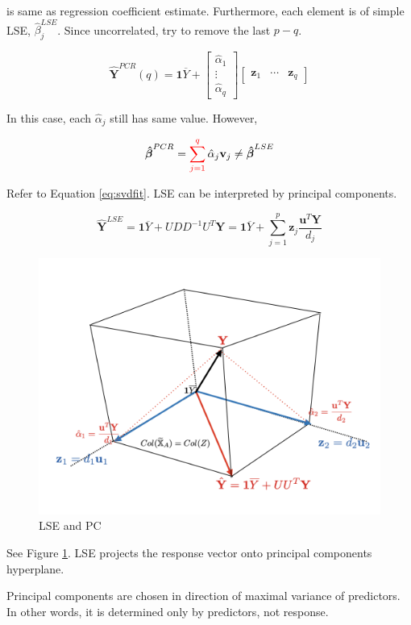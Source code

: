 \documentclass[]{book}
\theoremstyle{definition}
\theoremstyle{definition}
\theoremstyle{definition}
\theoremstyle{remark}
\begin{document}
is same as regression coefficient estimate. Furthermore, each element is of simple LSE, \(\hat\beta_j^{LSE}\). Since uncorrelated, try to remove the last \(p - q\).

\[
\hat{\mathbf{Y}}^{PCR}(q) = \mathbf{1} \overline{Y} + \begin{bmatrix}
  \hat\alpha_1 \\
  \vdots \\
  \hat\alpha_q
\end{bmatrix} \begin{bmatrix}
  \mathbf{z}_1 & \cdots & \mathbf{z}_q
\end{bmatrix}
\]

In this case, each \(\hat\alpha_j\) still has same value. However,

\[\boldsymbol{\hat\beta}^{PCR} = \sum_{j = 1}^{\color{red}{q}} \hat\alpha_j \mathbf{v}_j \neq \boldsymbol{\hat\beta}^{LSE}\]

Refer to Equation \eqref{eq:svdfit}. LSE can be interpreted by principal components.

\[\hat{\mathbf{Y}}^{LSE} = \mathbf{1} \overline{Y} + UDD^{-1} U^T \mathbf{Y} = \mathbf{1} \overline{Y} + \sum_{j = 1}^p \mathbf{z}_j \frac{\mathbf{u}^T \mathbf{Y}}{d_j}\]

\begin{figure}[H]

{\centering \includegraphics[width=0.7\linewidth]{images/pcrlse} 

}

\caption{LSE and PC}\label{fig:lsepc}
\end{figure}

See Figure \ref{fig:lsepc}. LSE projects the response vector onto principal components hyperplane.

Principal components are chosen in direction of maximal variance of predictors. In other words, it is determined only by predictors, not response.
\end{document}
